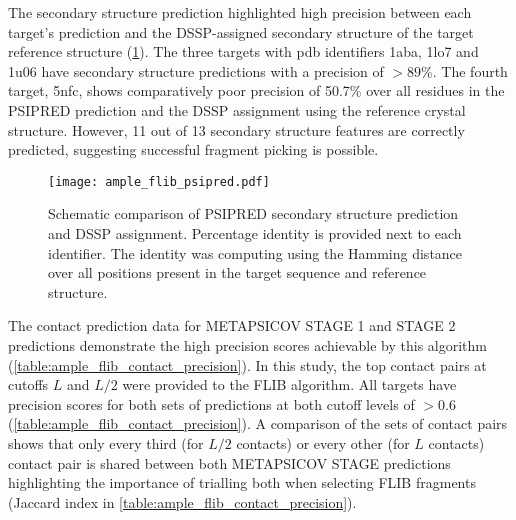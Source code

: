 The secondary structure prediction highlighted high precision between each target's prediction and the DSSP-assigned \cite{Frishman1995-ns} secondary structure of the target reference structure (\cref{fig:ample_flib_psipred}). The three targets with \gls{pdb} identifiers 1aba, 1lo7 and 1u06 have secondary structure predictions with a precision of $>89$\%. The fourth target, 5nfc, shows comparatively poor precision of 50.7\% over all residues in the PSIPRED prediction and the DSSP assignment using the reference crystal structure. However, 11 out of 13 secondary structure features are correctly predicted, suggesting successful fragment picking is possible.

\begin{figure}[H]
	\centering
	\texttt{[image: ample\_flib\_psipred.pdf]}
	\caption[PSIPRED schema for FLIB targets]{Schematic comparison of PSIPRED \cite{Jones1999-fi} secondary structure prediction and DSSP \cite{Frishman1995-ns} assignment. Percentage identity is provided next to each identifier. The identity was computing using the Hamming distance over all positions present in the target sequence and reference structure.}
	\label{fig:ample_flib_psipred}
\end{figure}

The contact prediction data for METAPSICOV STAGE 1 and STAGE 2 predictions demonstrate the high precision scores achievable by this algorithm (\cref{table:ample_flib_contact_precision}). In this study, the top contact pairs at cutoffs $L$ and $L/2$ were provided to the FLIB algorithm. All targets have precision scores for both sets of predictions at both cutoff levels of $>0.6$ (\cref{table:ample_flib_contact_precision}). A comparison of the sets of contact pairs shows that only every third (for $L/2$ contacts) or every other (for $L$ contacts) contact pair is shared between both METAPSICOV STAGE predictions highlighting the importance of trialling both when selecting FLIB fragments (Jaccard index in \cref{table:ample_flib_contact_precision}).

